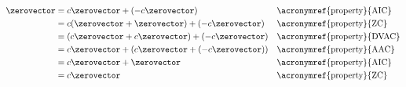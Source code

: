 \begin{align*}
\zerovector
&= c\zerovector + (-c\zerovector)&&\text{\acronymref{property}{AIC}}\\
&= c(\zerovector + \zerovector) + (-c\zerovector)&&\text{\acronymref{property}{ZC}}\\
&= (c\zerovector + c\zerovector) + (-c\zerovector)&&\text{\acronymref{property}{DVAC}}\\
&= c\zerovector + (c\zerovector + (-c\zerovector))&&\text{\acronymref{property}{AAC}}\\
&= c\zerovector + \zerovector&&\text{\acronymref{property}{AIC}}\\
&= c\zerovector&&\text{\acronymref{property}{ZC}}
\end{align*}
